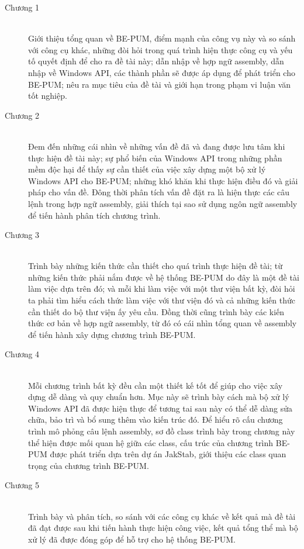 \newpage
\begin{description}
  	\item[Chương 1] \hfill \\
	Giới thiệu tổng quan về BE-PUM, điểm mạnh của công vụ này và so sánh với công cụ khác, những đòi hỏi trong quá trình hiện thực công cụ và yếu tố quyết  định để cho ra đề tài này; dẫn nhập về hợp ngữ assembly, dẫn nhập về Windows API, các thành phần sẽ được áp dụng để phát triển cho BE-PUM; nêu ra mục tiêu của đề tài và giới hạn trong phạm vi luận văn tốt nghiệp. \\
 	\item[Chương 2] \hfill \\
	Đem đến những cái nhìn về những vấn đề đã và đang được lưu tâm khi thực hiện đề tài này; sự phổ biến của Windows API trong những phần mềm độc hại để thấy sự cần thiết của việc xây dựng một bộ xử lý Windows API cho BE-PUM; những khó khăn khi thực hiện điều đó và giải pháp cho vấn đề. Đông thời phân tích vấn đề đặt ra là hiện thực các câu lệnh trong hợp ngữ assembly, giải thích tại sao sử dụng ngôn ngữ assembly để tiến hành phân tích chương trình.\\
	\item[Chương 3] \hfill \\
	Trình bày những kiến thức cần thiết cho quá trình thực hiện đề tài; từ những kiến thức phải nắm được về hệ thống BE-PUM do đây là một đề tài làm việc dựa trên đó; và mỗi khi làm việc với một thư viện bất kỳ, đòi hỏi ta phải tìm hiểu cách thức làm việc với thư viện đó và cả những kiến thức cần thiết do bộ thư viện ấy yêu cầu. Đồng thời cũng trình bày các kiến thức cơ bản về hợp ngữ assembly, từ đó có cái nhìn tổng quan về assembly để tiến hành xây dựng chương trình BE-PUM. \\
	\item[Chương 4] \hfill \\
	Mỗi chương trình bất kỳ đều cần một thiết kế tốt để giúp cho việc xây dựng dễ dàng và quy chuẩn hơn. Mục này sẽ trình bày cách mà bộ xử lý Windows API đã được hiện thực để tương tai sau này có thể dễ dàng sửa chữa, bảo trì và bổ sung thêm vào kiến trúc đó. Để hiểu rõ cấu chương trình mô phỏng câu lệnh assembly, sơ đồ class trình bày trong chương này thể hiện được mối quan hệ giữa các class, cấu trúc của chương trình BE-PUM được phát triển dựa trên dự án JakStab, giới thiệu các class quan trọng của chương trình BE-PUM.\\
	\item[Chương 5] \hfill \\
	 Trình bày và phân tích, so sánh với các công cụ khác về kết quả mà đề tài đã đạt được sau khi tiến hành thực hiện công việc, kết quả tổng thể mà bộ xử lý đã được đóng góp để hỗ trợ cho hệ thống BE-PUM.\\

\end{description}
